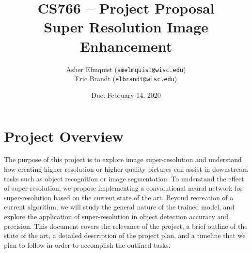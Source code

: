 \documentclass{article}
\title{CS766 -- Project Proposal \\ Super Resolution Image Enhancement}
\author{Asher Elmquist (\texttt{amelmquist@wisc.edu}) \\
Eric Brandt (\texttt{elbrandt@wisc.edu})
}
\date{Due: February 14, 2020}
\begin{document}
\maketitle


\section{Project Overview}
The purpose of this project is to explore image super-resolution and understand how creating higher resolution or higher quality pictures can assist in downstream tasks such as object recognition or image segmentation. To understand the effect of super-resolution, we propose implementing a convolutional neural network for super-resolution based on the current state of the art. Beyond recreation of a current algorithm, we will study the general nature of the trained model, and explore the application of super-resolution in object detection accuracy and precision. This document covers the relevance of the project, a brief outline of the state of the art, a detailed description of the project plan, and a timeline that we plan to follow in order to accomplish the outlined tasks. 
\end{document}
